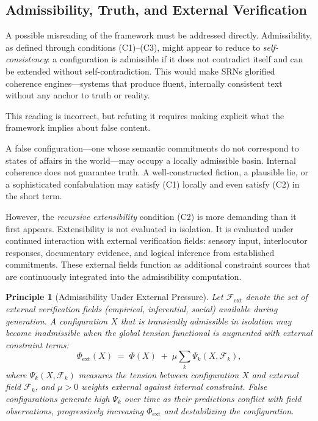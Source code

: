 \documentclass[11pt, a4paper]{article}
\theoremstyle{srn}
\newtheorem{principle}{Principle}[section]
\theoremstyle{srnremark}
\newcommand{\Phiten}{\varPhi}            %
\begin{document}
\subsection{Admissibility, Truth, and External Verification}

A possible misreading of the framework must be addressed directly.
Admissibility, as defined through conditions (C1)--(C3), might appear
to reduce to \emph{self-consistency}: a configuration is admissible if
it does not contradict itself and can be extended without
self-contradiction.
This would make SRNs glorified coherence engines---systems that produce
fluent, internally consistent text without any anchor to truth or
reality.

This reading is incorrect, but refuting it requires making explicit
what the framework implies about false content.

A false configuration---one whose semantic commitments do not
correspond to states of affairs in the world---may occupy a locally
admissible basin.
Internal coherence does not guarantee truth.
A well-constructed fiction, a plausible lie, or a sophisticated
confabulation may satisfy (C1) locally and even satisfy (C2) in
the short term.

However, the \emph{recursive extensibility} condition (C2) is more
demanding than it first appears.
Extensibility is not evaluated in isolation.
It is evaluated under continued interaction with external verification
fields: sensory input, interlocutor responses, documentary evidence,
and logical inference from established commitments.
These external fields function as additional constraint sources that
are continuously integrated into the admissibility computation.

\begin{principle}[Admissibility Under External Pressure]
\label{prin:truth}
Let $\mathcal{F}_{\mathrm{ext}}$ denote the set of external
verification fields (empirical, inferential, social) available during
generation.
A configuration $X$ that is transiently admissible in isolation may
become inadmissible when the global tension functional is augmented
with external constraint terms:
\[
  \Phiten_{\mathrm{ext}}(X)
  \;=\;
  \Phiten(X)
  \;+\;
  \mu \sum_{k} \Psi_k(X, \mathcal{F}_k),
\]
where $\Psi_k(X, \mathcal{F}_k)$ measures the tension between
configuration $X$ and external field $\mathcal{F}_k$, and $\mu > 0$
weights external against internal constraint.
False configurations generate high $\Psi_k$ over time as their
predictions conflict with field observations, progressively increasing
$\Phiten_{\mathrm{ext}}$ and destabilizing the configuration.
\end{principle}
\end{document}

